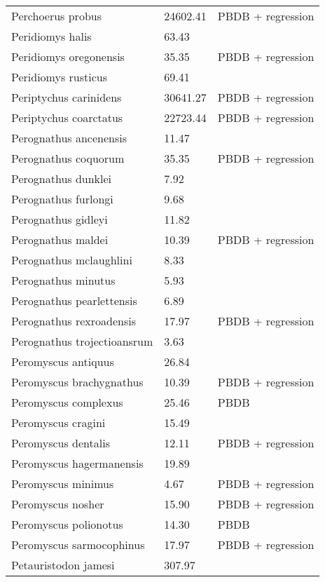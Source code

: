 \documentclass{article}
\begin{document}
\begin{center}
\begin{longtable}{p{} p{} p{} }
  Perchoerus probus & 24602.41 & PBDB + regression \\ 
  Peridiomys halis & 63.43 & \cite{Tomiya2013} \\ 
  Peridiomys oregonensis & 35.35 & PBDB + regression \\ 
  Peridiomys rusticus & 69.41 & \cite{Tomiya2013} \\ 
  Periptychus carinidens & 30641.27 & PBDB + regression \\ 
  Periptychus coarctatus & 22723.44 & PBDB + regression \\ 
  Perognathus ancenensis & 11.47 & \cite{Tomiya2013} \\ 
  Perognathus coquorum & 35.35 & PBDB + regression \\ 
  Perognathus dunklei & 7.92 & \cite{Tomiya2013} \\ 
  Perognathus furlongi & 9.68 & \cite{Tomiya2013} \\ 
  Perognathus gidleyi & 11.82 & \cite{Tomiya2013} \\ 
  Perognathus maldei & 10.39 & PBDB + regression \\ 
  Perognathus mclaughlini & 8.33 & \cite{Tomiya2013} \\ 
  Perognathus minutus & 5.93 & \cite{Tomiya2013} \\ 
  Perognathus pearlettensis & 6.89 & \cite{Tomiya2013} \\ 
  Perognathus rexroadensis & 17.97 & PBDB + regression \\ 
  Perognathus trojectioansrum & 3.63 & \cite{Tomiya2013} \\ 
  Peromyscus antiquus & 26.84 & \cite{Tomiya2013} \\ 
  Peromyscus brachygnathus & 10.39 & PBDB + regression \\ 
  Peromyscus complexus & 25.46 & PBDB \\ 
  Peromyscus cragini & 15.49 & \cite{Tomiya2013} \\ 
  Peromyscus dentalis & 12.11 & PBDB + regression \\ 
  Peromyscus hagermanensis & 19.89 & \cite{Tomiya2013} \\ 
  Peromyscus minimus & 4.67 & PBDB + regression \\ 
  Peromyscus nosher & 15.90 & PBDB + regression \\ 
  Peromyscus polionotus & 14.30 & PBDB \\ 
  Peromyscus sarmocophinus & 17.97 & PBDB + regression \\ 
  Petauristodon jamesi & 307.97 & \cite{Tomiya2013} \\ 

\end{longtable}
\end{center}
\end{document}

